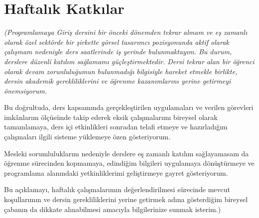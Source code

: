 \documentclass[12pt,a4paper]{article}
\newcommand{\aciklama}[1]{{\color{gray}\itshape (#1)}}
\begin{document}
\section{Haftalık Katkılar}
\aciklama{Programlamaya Giriş dersini bir önceki dönemden tekrar almam ve eş zamanlı olarak özel sektörde bir şirkette görsel tasarımcı pozisyonunda aktif olarak çalışmam nedeniyle ders saatlerinde iş yerinde bulunmaktayım. Bu durum, derslere düzenli katılım sağlamamı güçleştirmektedir. Dersi tekrar alan bir öğrenci olarak devam zorunluluğumun bulunmadığı bilgisiyle hareket etmekle birlikte, dersin akademik gerekliliklerini ve öğrenme kazanımlarını yerine getirmeyi önemsiyorum.

Bu doğrultuda, ders kapsamında gerçekleştirilen uygulamaları ve verilen görevleri imkânlarım ölçüsünde takip ederek eksik çalışmalarımı bireysel olarak tamamlamaya, ders içi etkinlikleri sonradan telafi etmeye ve hazırladığım çalışmaları ilgili sisteme yüklemeye özen gösteriyorum.

Mesleki sorumluluklarım nedeniyle derslere eş zamanlı katılım sağlayamasam da öğrenme sürecinden kopmamaya, edindiğim bilgileri uygulamaya dönüştürmeye ve programlama alanındaki yetkinliklerimi geliştirmeye gayret gösteriyorum.

Bu açıklamayı, haftalık çalışmalarımın değerlendirilmesi sürecinde mevcut koşullarımın ve dersin gerekliliklerini yerine getirmek adına gösterdiğim bireysel çabanın da dikkate alınabilmesi amacıyla bilgilerinize sunmak isterim.}
\end{document}
